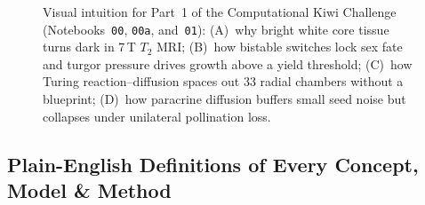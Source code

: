 \documentclass[10.5pt,a4paper]{article}
\begin{document}
\begin{figure}[H]
\caption{Visual intuition for Part~1 of the Computational Kiwi Challenge (Notebooks~\texttt{00}, \texttt{00a}, and~\texttt{01}): (A)~why bright white core tissue turns dark in 7\,T $T_2$ MRI; (B)~how bistable switches lock sex fate and turgor pressure drives growth above a yield threshold; (C)~how Turing reaction--diffusion spaces out 33 radial chambers without a blueprint; (D)~how paracrine diffusion buffers small seed noise but collapses under unilateral pollination loss.}
\label{fig:lab5-p1-intuition}
\end{figure}

\newpage
\subsection{Plain-English Definitions of Every Concept, Model \& Method}
\end{document}
